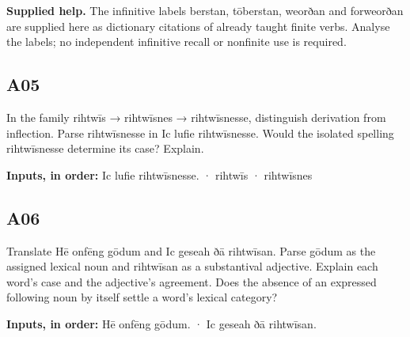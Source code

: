 \textbf{Supplied help.} The infinitive labels berstan, tōberstan, weorðan and forweorðan are supplied here as dictionary citations of already taught finite verbs. Analyse the labels; no independent infinitive recall or nonfinite use is required.

\par\begin{minipage}{\linewidth}\raggedright
\subsection*{A05}

In the family rihtwīs → rihtwīsnes → rihtwīsnesse, distinguish derivation from inflection. Parse rihtwīsnesse in Ic lufie rihtwīsnesse. Would the isolated spelling rihtwīsnesse determine its case? Explain.

\textbf{Inputs, in order:} Ic lufie rihtwīsnesse. · rihtwīs · rihtwīsnes

\end{minipage}\par\addvspace{4pt}

\par\begin{minipage}{\linewidth}\raggedright
\subsection*{A06}

Translate Hē onfēng gōdum and Ic geseah ðā rihtwīsan. Parse gōdum as the assigned lexical noun and rihtwīsan as a substantival adjective. Explain each word’s case and the adjective’s agreement. Does the absence of an expressed following noun by itself settle a word’s lexical category?

\textbf{Inputs, in order:} Hē onfēng gōdum. · Ic geseah ðā rihtwīsan.

\end{minipage}\par\addvspace{4pt}

